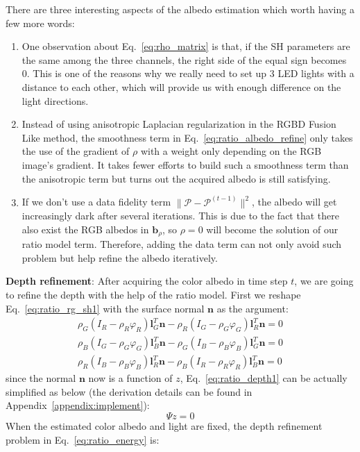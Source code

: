 There are three interesting aspects of the albedo estimation which worth having a few more words:
\begin{enumerate}
    \item One observation about Eq.~\ref{eq:rho_matrix} is that, if the SH parameters are the same among the three channels, the right side of the equal sign becomes 0. 
    This is one of the reasons why we really need to set up 3 LED lights with a distance to each other, which will provide us with enough difference on the light directions.
    \item Instead of using anisotropic Laplacian regularization in the RGBD Fusion Like method, the smoothness term in Eq.~\ref{eq:ratio_albedo_refine} only takes the use of the gradient of $\rho$ with a weight only depending on the RGB image's gradient.
    It takes fewer efforts to build such a smoothness term than the anisotropic term but turns out the acquired albedo is still satisfying.
    \item If we don't use a data fidelity term $\lVert \mathcal{P} - \mathcal{P}^{(t-1)}\rVert^2$, the albedo will get increasingly dark after several iterations. 
    This is due to the fact that there also exist the RGB albedos in $\mathbf{b}_{\rho}$, so $\rho = 0$ will become the solution of our ratio model term.
    Therefore, adding the data term can not only avoid such problem but help refine the albedo iteratively. 
\end{enumerate}

\textbf{Depth refinement}:
After acquiring the color albedo in time step $t$, we are going to refine the depth with the help of the ratio model.
First we reshape Eq.~\ref{eq:ratio_rg_sh1} with the surface normal $\mathbf{n}$ as the argument:
\begin{equation}\label{eq:ratio_depth1}
\begin{split}
\rho_G (I_R - \rho_R \varphi_R)\mathbf{l}_G^T \mathbf{n} - \rho_R (I_G - \rho_G \varphi_G)\mathbf{l}_R^T\mathbf{n} = 0\\
\rho_B (I_G - \rho_G \varphi_G)\mathbf{l}_B^T \mathbf{n} - \rho_G (I_B - \rho_B \varphi_B)\mathbf{l}_G^T\mathbf{n} = 0\\
\rho_R (I_B - \rho_B \varphi_B)\mathbf{l}_R^T \mathbf{n} - \rho_B (I_R - \rho_R \varphi_R)\mathbf{l}_B^T\mathbf{n} = 0 
\end{split}
\end{equation}
since the normal $\mathbf{n}$ now is a function of $z$, Eq.~\ref{eq:ratio_depth1} can be actually simplified as below (the derivation details can be found in Appendix~\ref{appendix:implement}):
\begin{equation}
    \Psi z = 0
\end{equation}
When the estimated color albedo and light are fixed, the depth refinement problem in Eq.~\ref{eq:ratio_energy} is:

